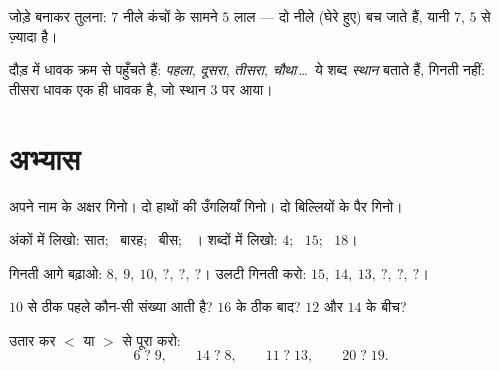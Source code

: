 \begin{omfigure}

{\small जोड़े बनाकर तुलना: $7$ नीले कंचों के सामने $5$ लाल
--- दो नीले (घेरे हुए) बच जाते हैं, यानी $7$, $5$ से ज़्यादा है।}
\end{omfigure}

\begin{example}[पहला, दूसरा, तीसरा]\label{ex:g1:counting:ordinal}
दौड़ में धावक क्रम से पहुँचते हैं: \emph{पहला},
\emph{दूसरा}, \emph{तीसरा}, \emph{चौथा}\,\dots\ ये
शब्द \emph{स्थान} बताते हैं, गिनती नहीं: तीसरा धावक एक ही धावक
है, जो स्थान $3$ पर आया।
\end{example}

\section{अभ्यास}

\begin{exercise}[$\star$]\label{exo:g1:counting:1}
अपने नाम के अक्षर गिनो। दो हाथों की उँगलियाँ गिनो। दो बिल्लियों
के पैर गिनो।
\end{exercise}

\begin{exercise}[$\star$]\label{exo:g1:counting:2}
अंकों में लिखो: सात; \ बारह; \ बीस; \ । शब्दों में लिखो:
$4$; \ $15$; \ $18$।
\end{exercise}

\begin{exercise}[$\star$]\label{exo:g1:counting:3}
गिनती आगे बढ़ाओ: $8,\ 9,\ 10,\ ?,\ ?,\ ?$। उलटी गिनती करो:
$15,\ 14,\ 13,\ ?,\ ?,\ ?$।
\end{exercise}

\begin{exercise}[$\star$]\label{exo:g1:counting:4}
$10$ से ठीक पहले कौन-सी संख्या आती है? $16$ के ठीक बाद? $12$
और $14$ के बीच?
\end{exercise}

\begin{exercise}[$\star$]\label{exo:g1:counting:5}
उतार कर $<$ या $>$ से पूरा करो:
\[
6 \;?\; 9, \qquad
14 \;?\; 8, \qquad
11 \;?\; 13, \qquad
20 \;?\; 19 .
\]
\end{exercise}

